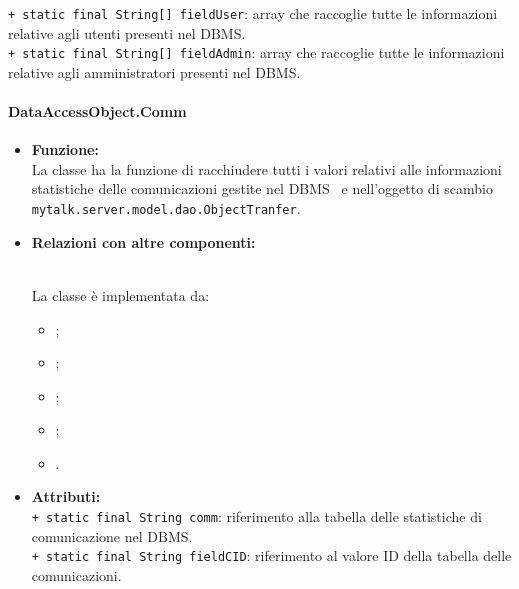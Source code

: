 {\begin{sloppypar}
{{{{\begin{itemize}
{					\texttt{+ static final String[] fieldUser}: array che raccoglie tutte le informazioni relative agli utenti presenti nel DBMS\g.\\
					
					\texttt{+ static final String[] fieldAdmin}: array che raccoglie tutte le informazioni relative agli amministratori presenti nel DBMS\g.\\
				}
			\end{itemize}
		}%
		
		
		\paragraph{DataAccessObject.Comm}\label{par:DataAccessObjectComm}{
			\begin{itemize}
			
				\item[] \textbf{Funzione:}{\\
				La classe ha la funzione di racchiudere tutti i valori relativi alle informazioni   statistiche delle comunicazioni gestite nel DBMS\g~ e nell'oggetto di scambio \texttt{mytalk.server.model.dao.ObjectTranfer}.\\
				 }
			
			\item[] \textbf{Relazioni con altre componenti:}{\\			
				La classe è implementata da:
					\begin{itemize}
						\item[] ;
						\item[] ;
						\item[] ;
						\item[]	;
						\item[]	.\\
					\end{itemize}
				}
				
				\item[] \textbf{Attributi:}{\\
					\texttt{+ static final String comm}: riferimento alla tabella  delle statistiche di comunicazione nel DBMS\g.\\

					\texttt{+ static final String fieldCID}: riferimento al valore ID della tabella delle comunicazioni.\\
					
}
\end{itemize}}}}}
\end{sloppypar}}
